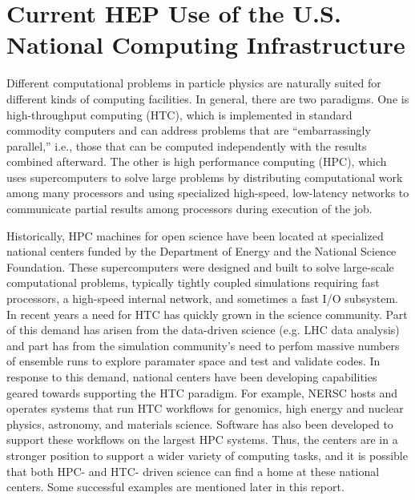 \section{Current HEP Use of the U.S. National Computing Infrastructure}

Different computational problems in particle physics are naturally suited for different kinds of computing facilities.  In general, there are two paradigms.  One is high-throughput computing (HTC), which is implemented in standard commodity computers and can address problems that are ``embarrassingly parallel,'' i.e., those that can be computed independently with the results combined afterward.  The other is high performance computing (HPC), which uses supercomputers to solve large problems by distributing computational work among many processors and using specialized high-speed, low-latency networks to communicate partial results among processors during execution of the job.

Historically, HPC machines for open science have been located at specialized national centers funded by the 
Department of Energy and the National 
Science Foundation. These supercomputers were designed and built to solve large-scale computational problems, 
typically tightly coupled simulations requiring fast processors, a high-speed internal network, and sometimes a 
fast I/O subsystem. In recent years a need for HTC has quickly grown in the science community. Part of this demand has arisen from
the data-driven science (e.g. LHC data analysis) and part has from the simulation community's need to perfom 
massive numbers of ensemble runs to explore paramater space and test and validate codes. 
In response to this demand, national centers have been developing capabilities geared towards supporting the HTC paradigm.  
For example, NERSC hosts and operates systems that run HTC workflows for genomics, high energy and nuclear physics,
astronomy, and materials science. Software has also been developed to support these workflows on the largest HPC systems.
Thus, the centers are in a stronger position to support a wider variety of computing tasks, and it is possible that both HPC- and HTC- driven science can find a home at these national centers.  Some successful examples are mentioned later in this report.

